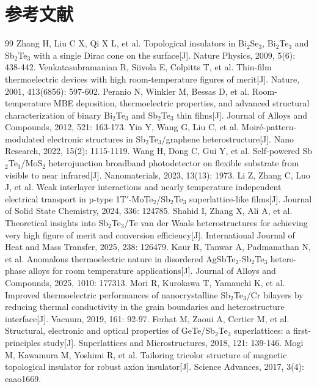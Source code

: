 \documentclass[12pt,a4paper]{ctexart}
\begin{document}
\section*{参考文献}
\begin{thebibliography}{99}
 Zhang H, Liu C X, Qi X L, et al. Topological insulators in Bi$_2$Se$_3$, Bi$_2$Te$_3$ and Sb$_2$Te$_3$ with a single Dirac cone on the surface[J]. Nature Physics, 2009, 5(6): 438-442.
 Venkatasubramanian R, Siivola E, Colpitts T, et al. Thin-film thermoelectric devices with high room-temperature figures of merit[J]. Nature, 2001, 413(6856): 597-602.
 Peranio N, Winkler M, Bessas D, et al. Room-temperature MBE deposition, thermoelectric properties, and advanced structural characterization of binary Bi$_2$Te$_3$ and Sb$_2$Te$_3$ thin films[J]. Journal of Alloys and Compounds, 2012, 521: 163-173.
 Yin Y, Wang G, Liu C, et al. Moir\'e-pattern-modulated electronic structures in Sb$_2$Te$_3$/graphene heterostructure[J]. Nano Research, 2022, 15(2): 1115-1119.
 Wang H, Dong C, Gui Y, et al. Self-powered Sb$_2$Te$_3$/MoS$_2$ heterojunction broadband photodetector on flexible substrate from visible to near infrared[J]. Nanomaterials, 2023, 13(13): 1973.
 Li Z, Zhang C, Luo J, et al. Weak interlayer interactions and nearly temperature independent electrical transport in p-type 1T$'$-MoTe$_2$/Sb$_2$Te$_3$ superlattice-like films[J]. Journal of Solid State Chemistry, 2024, 336: 124785.
 Shahid I, Zhang X, Ali A, et al. Theoretical insights into Sb$_2$Te$_3$/Te van der Waals heterostructures for achieving very high figure of merit and conversion efficiency[J]. International Journal of Heat and Mass Transfer, 2025, 238: 126479.
 Kaur R, Tanwar A, Padmanathan N, et al. Anomalous thermoelectric nature in disordered AgSbTe$_2$-Sb$_2$Te$_3$ hetero-phase alloys for room temperature applications[J]. Journal of Alloys and Compounds, 2025, 1010: 177313.
 Mori R, Kurokawa T, Yamauchi K, et al. Improved thermoelectric performances of nanocrystalline Sb$_2$Te$_3$/Cr bilayers by reducing thermal conductivity in the grain boundaries and heterostructure interface[J]. Vacuum, 2019, 161: 92-97.
 Ferhat M, Zaoui A, Certier M, et al. Structural, electronic and optical properties of GeTe/Sb$_2$Te$_3$ superlattices: a first-principles study[J]. Superlattices and Microstructures, 2018, 121: 139-146.
 Mogi M, Kawamura M, Yoshimi R, et al. Tailoring tricolor structure of magnetic topological insulator for robust axion insulator[J]. Science Advances, 2017, 3(4): eaao1669.

\end{thebibliography}
\end{document}
